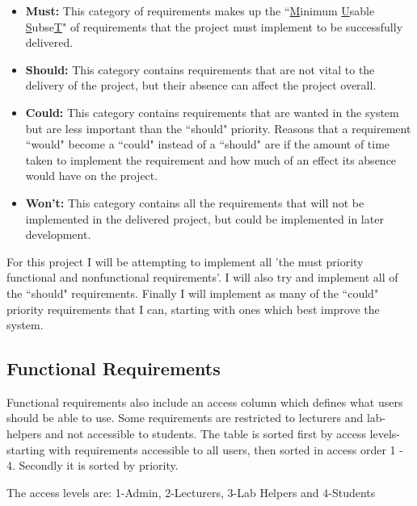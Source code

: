 \documentclass[11pt]{report}
\begin{document}
\begin{itemize}

\item \textbf{Must:} This category of requirements makes up the ``\underline{M}inimum \underline{U}sable \underline{S}ubse\underline{T}" of requirements that the project must implement to be successfully delivered.

\item \textbf{Should:} This category contains requirements that are not vital to the delivery of the project, but their absence can affect the project overall. 

\item \textbf{Could:} This category contains requirements that are wanted in the system but are less important than the ``should" priority. Reasons that a requirement ``would" become a ``could" instead of a ``should" are if the amount of time taken to implement the requirement and how much of an effect its absence would have on the project.   

\item \textbf{Won't:} This category contains all the requirements that will not be implemented in the delivered project, but could be implemented in later development.
\end{itemize}

\noindent For this project I will be attempting to implement all 'the must priority functional and nonfunctional requirements'. I will also try and implement all of the ``should" requirements. Finally I will implement as many of the ``could" priority requirements that I can, starting with ones which best improve the system.


\def\arraystretch{1.2}
\subsection{Functional Requirements} \label{sec:func}

Functional requirements also include an access column which defines what users should be able to use. Some requirements are restricted to lecturers and lab-helpers and not accessible to students. The table is sorted first by access levels- starting with requirements accessible to all users, then sorted in access order 1 - 4. Secondly it is sorted by priority.

The access levels are: 1-Admin, 2-Lecturers, 3-Lab Helpers and 4-Students
\end{document}
